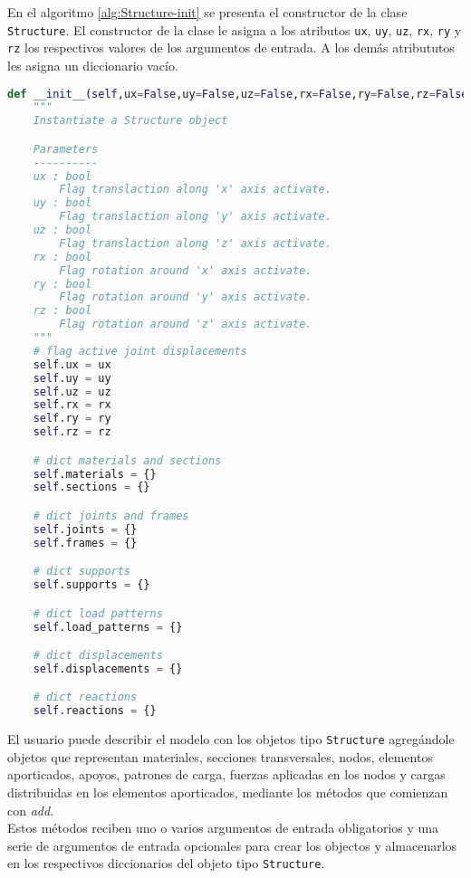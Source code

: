 En el algoritmo \ref{alg:Structure-init} se presenta el constructor de la clase \verb|Structure|. El constructor de la clase le asigna a los atributos \verb|ux|, \verb|uy|, \verb|uz|, \verb|rx|, \verb|ry| y \verb|rz| los respectivos valores de los argumentos de entrada. A los demás atribututos les asigna un diccionario vacío.\\
\pagebreak
\begin{lstlisting}[language=Python,caption=Constructor de la clase \texttt{Structure}.,label=alg:Structure-init, frame=single]
def __init__(self,ux=False,uy=False,uz=False,rx=False,ry=False,rz=False):
    """
    Instantiate a Structure object

    Parameters
    ----------
    ux : bool
        Flag translaction along 'x' axis activate.
    uy : bool
        Flag translaction along 'y' axis activate.
    uz : bool
        Flag translaction along 'z' axis activate.
    rx : bool
        Flag rotation around 'x' axis activate.
    ry : bool
        Flag rotation around 'y' axis activate.
    rz : bool
        Flag rotation around 'z' axis activate.
    """
    # flag active joint displacements
    self.ux = ux
    self.uy = uy
    self.uz = uz
    self.rx = rx
    self.ry = ry
    self.rz = rz

    # dict materials and sections
    self.materials = {}
    self.sections = {}

    # dict joints and frames
    self.joints = {}
    self.frames = {}

    # dict supports
    self.supports = {}

    # dict load patterns
    self.load_patterns = {}

    # dict displacements
    self.displacements = {}

    # dict reactions
    self.reactions = {}
\end{lstlisting}
\bigskip
El usuario puede describir el modelo con los objetos tipo \verb|Structure| agregándole objetos que representan materiales, secciones transversales, nodos, elementos aporticados, apoyos, patrones de carga, fuerzas aplicadas en los nodos y cargas distribuidas en los elementos aporticados, mediante los métodos que comienzan con \emph{add}.\\

Estos métodos reciben uno o varios argumentos de entrada obligatorios y una serie de argumentos de entrada opcionales para crear los objectos y almacenarlos en los respectivos diccionarios del objeto tipo \verb|Structure|.\\


